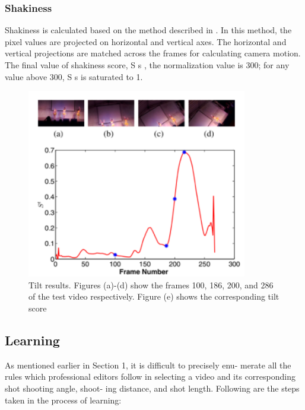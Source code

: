\documentclass[conference]{IEEEtran}
\begin{document}
\subsubsection{Shakiness}Shakiness is calculated based on the method described in \cite{4}.
In this method, the pixel values are projected on horizontal and
vertical axes. The horizontal and vertical projections are matched
across the frames for calculating camera motion. The final value of shakiness
score, S s , the normalization value is 300;
for any value above 300, S s is saturated to 1.


\begin{figure}
    \centering
    \includegraphics{img4.png}
    \caption{Tilt results. Figures (a)-(d) show the frames 100, 186,
200, and 286 of the test video respectively. Figure (e) shows the
corresponding tilt score}
    \label{fig:my_label}
\end{figure}


\subsection{Learning}
As mentioned earlier in Section 1, it is difficult to precisely enu-
merate all the rules which professional editors follow in selecting
a video and its corresponding shot shooting angle, shoot-
ing distance, and shot length. Following are the steps taken in the
process of learning:
\end{document}
